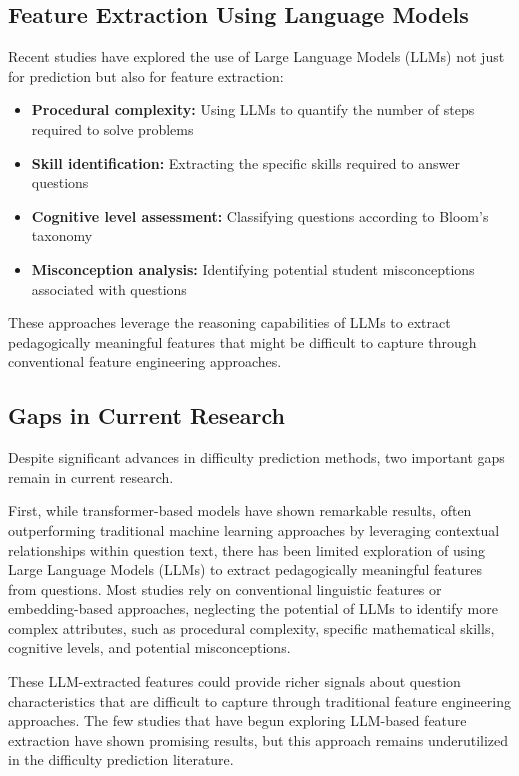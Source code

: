\documentclass[
    a4paper, %
    10pt, %
    twoside, %
]{LTJournalArticle}
\begin{document}
\subsection{Feature Extraction Using Language Models}

Recent studies have explored the use of Large Language Models (LLMs) not just for prediction but also for feature extraction:

\begin{itemize}
    \item \textbf{Procedural complexity:} Using LLMs to quantify the number of steps required to solve problems \cite{liu2023improving}
    \item \textbf{Skill identification:} Extracting the specific skills required to answer questions \cite{didolkar2024metacognitive}
    \item \textbf{Cognitive level assessment:} Classifying questions according to Bloom's taxonomy \cite{scaria2024automated}
    \item \textbf{Misconception analysis:} Identifying potential student misconceptions associated with questions \cite{sadihin2024proposalml}
\end{itemize}

These approaches leverage the reasoning capabilities of LLMs to extract pedagogically meaningful features that might be difficult to capture through conventional feature engineering approaches.

\subsection{Gaps in Current Research}

Despite significant advances in difficulty prediction methods, two important gaps remain in current research.

First, while transformer-based models have shown remarkable results, often outperforming traditional machine learning approaches by leveraging contextual relationships within question text, there has been limited exploration of using Large Language Models (LLMs) to extract pedagogically meaningful features from questions. Most studies rely on conventional linguistic features or embedding-based approaches, neglecting the potential of LLMs to identify more complex attributes, such as procedural complexity, specific mathematical skills, cognitive levels, and potential misconceptions.

These LLM-extracted features could provide richer signals about question characteristics that are difficult to capture through traditional feature engineering approaches. The few studies that have begun exploring LLM-based feature extraction have shown promising results, but this approach remains underutilized in the difficulty prediction literature.
\end{document}
